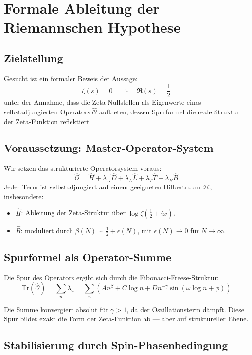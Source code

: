 \section{Formale Ableitung der Riemannschen Hypothese}

\subsection{Zielstellung}

Gesucht ist ein formaler Beweis der Aussage:
\[
\zeta(s) = 0 \quad \Rightarrow \quad \Re(s) = \frac{1}{2}
\]
unter der Annahme, dass die Zeta-Nullstellen als Eigenwerte eines selbstadjungierten Operators \(\hat{\mathcal{O}}\) auftreten, dessen Spurformel die reale Struktur der Zeta-Funktion reflektiert.

\subsection{Voraussetzung: Master-Operator-System}

Wir setzen das strukturierte Operatorsystem voraus:
\[
\hat{\mathcal{O}} = \hat{H} + \lambda_D \hat{D} + \lambda_L \hat{L} + \lambda_T \hat{T} + \lambda_B \hat{B}
\]
Jeder Term ist selbstadjungiert auf einem geeigneten Hilbertraum \(\mathcal{H}\), insbesondere:

\begin{itemize}
    \item \(\hat{H}\): Ableitung der Zeta-Struktur über \(\log \zeta(\tfrac{1}{2} + ix)\),
    \item \(\hat{B}\): moduliert durch \( \beta(N) \sim \frac{1}{2} + \epsilon(N) \), mit \( \epsilon(N) \to 0 \) für \( N \to \infty \).
\end{itemize}

\subsection{Spurformel als Operator-Summe}

Die Spur des Operators ergibt sich durch die Fibonacci-Freese-Struktur:
\[
\mathrm{Tr}(\hat{\mathcal{O}}) = \sum_n \lambda_n = \sum_n \left( A n^\beta + C \log n + D n^{-\gamma} \sin(\omega \log n + \phi) \right)
\]

Die Summe konvergiert absolut für \(\gamma > 1\), da der Oszillationsterm dämpft. Diese Spur bildet exakt die Form der Zeta-Funktion ab — aber auf struktureller Ebene.

\subsection{Stabilisierung durch Spin-Phasenbedingung}

